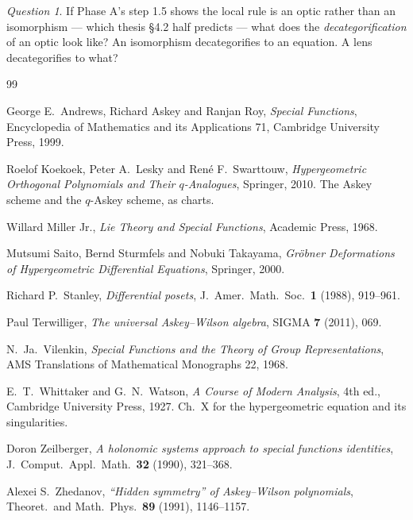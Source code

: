 \documentclass[11pt,a4paper]{article}
\theoremstyle{definition}
\theoremstyle{remark}
\newtheorem{question}[theorem]{Question}
\begin{document}
\begin{question}\label{q:lens}
If Phase A's step 1.5 shows the local rule is an optic rather than an isomorphism ---
which thesis \S4.2 half predicts --- what does the \emph{decategorification} of an
optic look like? An isomorphism decategorifies to an equation. A lens decategorifies
to what?
\end{question}

\begin{thebibliography}{99}

 George E.\ Andrews, Richard Askey and Ranjan Roy, \emph{Special
Functions}, Encyclopedia of Mathematics and its Applications 71, Cambridge University
Press, 1999.

 Roelof Koekoek, Peter A.\ Lesky and Ren\'e F.\ Swarttouw,
\emph{Hypergeometric Orthogonal Polynomials and Their $q$-Analogues}, Springer, 2010.
The Askey scheme and the $q$-Askey scheme, as charts.

 Willard Miller Jr., \emph{Lie Theory and Special Functions},
Academic Press, 1968.

 Mutsumi Saito, Bernd Sturmfels and Nobuki Takayama, \emph{Gr\"obner
Deformations of Hypergeometric Differential Equations}, Springer, 2000.

 Richard P.\ Stanley, \emph{Differential posets}, J.\ Amer.\ Math.\
Soc.\ \textbf{1} (1988), 919--961.

 Paul Terwilliger, \emph{The universal Askey--Wilson algebra},
SIGMA \textbf{7} (2011), 069.

 N.\ Ja.\ Vilenkin, \emph{Special Functions and the Theory of Group
Representations}, AMS Translations of Mathematical Monographs 22, 1968.

 E.\ T.\ Whittaker and G.\ N.\ Watson, \emph{A Course of Modern Analysis},
4th ed., Cambridge University Press, 1927. Ch.\ X for the hypergeometric equation and
its singularities.

 Doron Zeilberger, \emph{A holonomic systems approach to special
functions identities}, J.\ Comput.\ Appl.\ Math.\ \textbf{32} (1990), 321--368.

 Alexei S.\ Zhedanov, \emph{``Hidden symmetry'' of Askey--Wilson
polynomials}, Theoret.\ and Math.\ Phys.\ \textbf{89} (1991), 1146--1157.

\end{thebibliography}
\end{document}
